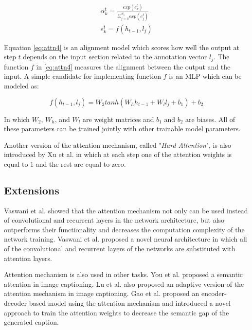 \documentclass[preprint, 10pt]{elsarticle}
\begin{document}
		\begin{align}
			\alpha_k^t = \frac{exp(e_k^t)}{\Sigma_{j=0}^{N_i} exp(e_j^t)} \label{eq:attn3}\\
			e_k^t = f(h_{t-1}, l_j) \label{eq:attn4}
		\end{align}
		
		Equation \eqref{eq:attn4} is an alignment model which scores how well the output at step $t$ depends on the input section related to the annotation vector $l_j$. The function $f$ in \eqref{eq:attn4} measures the alignment between the output and the input. A simple candidate for implementing function $f$ is an MLP which can be modeled as:
		
		\begin{equation}
			f(h_{t-1}, l_j) = W_2 tanh(W_h h_{t-1} + W_l l_{j} + b_1) + b_2
		\end{equation}
		
		In which $W_2$, $W_h$, and $W_l$ are weight matrices and $b_1$ and $b_2$ are biases. All of these parameters can be trained jointly with other trainable model parameters.
		
		Another version of the attention mechanism, called "\textit{Hard Attention}", is also introduced by Xu et al. \cite{xu2015show} in which at each step one of the attention weights is equal to 1 and the rest are equal to zero. 
		
		\subsection{Extensions}
		Vaswani et al. \cite{vaswani2017attention} showed that the attention mechanism not only can be used instead of convolutional and recurrent layers in the network architecture, but also outperforms their functionality and decreases the computation complexity of the network training. Vaswani et al. \cite{vaswani2017attention} proposed a novel neural architecture in which all of the convolutional and recurrent layers of the networks are substituted with attention layers.
		
		Attention mechanism is also used in other tasks. You et al. \cite{you2016image} proposed a semantic attention in image captioning. Lu et al. \cite{lu2017knowing} also proposed an adaptive version of the attention mechanism in image captioning. Gao et al. \cite{gao2017video} proposed an encoder-decoder based model using the attention mechanism and introduced a novel approach to train the attention weights to decrease the semantic gap of the generated caption. 
		
\end{document}
